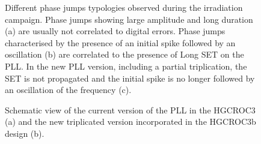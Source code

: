 \begin{figure}
    \centering
    \caption{Different phase jumps typologies observed during the irradiation campaign. Phase jumps showing large amplitude and long duration (a) are usually not correlated to digital errors. Phase jumps characterised by the presence of an initial spike followed by an oscillation (b) are correlated to the presence of Long SET on the PLL. In the new PLL version, including a partial triplication, the SET is not propagated and the initial spike is no longer followed by an oscillation of the frequency (c).}
    \label{fig:SET_PhaseJump}
\end{figure}

\begin{figure}
    \centering
    \caption{Schematic view of the current version of the PLL in the HGCROC3 (a) and the new triplicated version incorporated in the HGCROC3b design (b).}
    \label{fig:PLL_HGCROC3b}
\end{figure}

